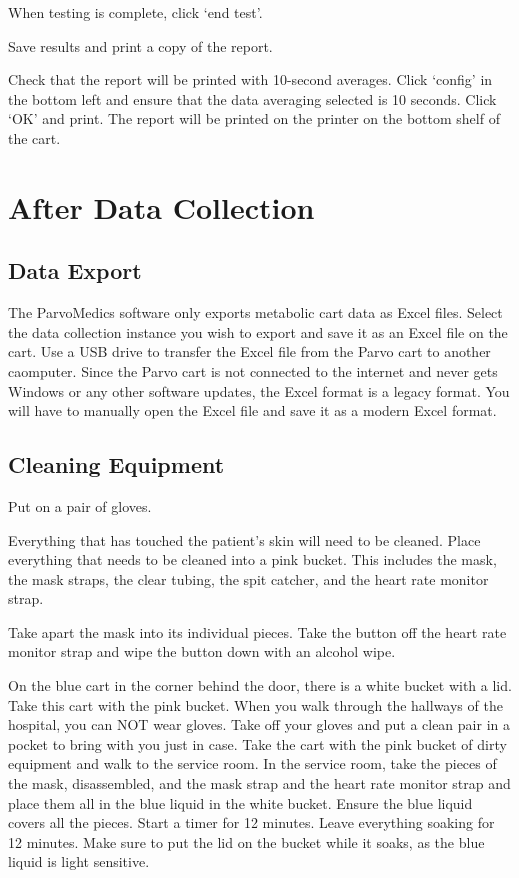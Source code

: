 \documentclass[
]{book}
\begin{document}
When testing is complete, click `end test'.

Save results and print a copy of the report.

Check that the report will be printed with 10-second averages. Click `config' in the bottom left and ensure that the data averaging selected is 10 seconds. Click `OK' and print. The report will be printed on the printer on the bottom shelf of the cart.

\hypertarget{Parvo-AfterDataCollection}{%
\section{After Data Collection}\label{Parvo-AfterDataCollection}}

\hypertarget{Parvo-DataExport}{%
\subsection{Data Export}\label{Parvo-DataExport}}

The ParvoMedics software only exports metabolic cart data as Excel files. Select the data collection instance you wish to export and save it as an Excel file on the cart. Use a USB drive to transfer the Excel file from the Parvo cart to another caomputer. Since the Parvo cart is not connected to the internet and never gets Windows or any other software updates, the Excel format is a legacy format. You will have to manually open the Excel file and save it as a modern Excel format.

\hypertarget{Parvo-CleanEquipment}{%
\subsection{Cleaning Equipment}\label{Parvo-CleanEquipment}}

Put on a pair of gloves.

Everything that has touched the patient's skin will need to be cleaned. Place everything that needs to be cleaned into a pink bucket. This includes the mask, the mask straps, the clear tubing, the spit catcher, and the heart rate monitor strap.

Take apart the mask into its individual pieces. Take the button off the heart rate monitor strap and wipe the button down with an alcohol wipe.

On the blue cart in the corner behind the door, there is a white bucket with a lid. Take this cart with the pink bucket. When you walk through the hallways of the hospital, you can NOT wear gloves. Take off your gloves and put a clean pair in a pocket to bring with you just in case. Take the cart with the pink bucket of dirty equipment and walk to the service room. In the service room, take the pieces of the mask, disassembled, and the mask strap and the heart rate monitor strap and place them all in the blue liquid in the white bucket. Ensure the blue liquid covers all the pieces. Start a timer for 12 minutes. Leave everything soaking for 12 minutes. Make sure to put the lid on the bucket while it soaks, as the blue liquid is light sensitive.
\end{document}
